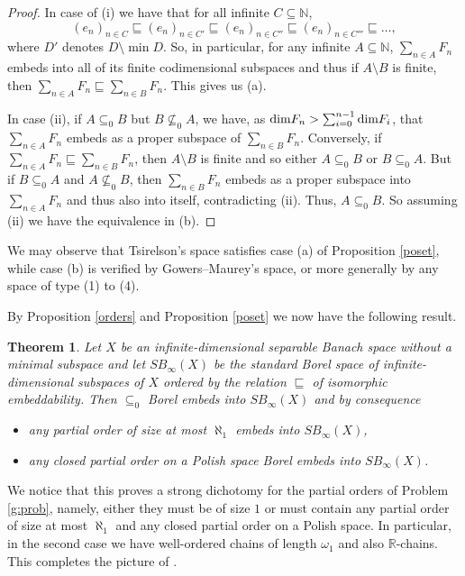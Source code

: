 \documentclass[10pt]{amsart}
\numberwithin{equation}{section}
\newtheorem{thm}{Theorem}[section]
\begin{document}
\begin{proof}
In case of (i) we have that for all infinite $C\subseteq {\mathbb N}$,
$$
(e_n)_{n\in C}\sqsubseteq(e_n)_{n\in C'}\sqsubseteq(e_n)_{n\in C''}\sqsubseteq(e_n)_{n\in C'''}\sqsubseteq\ldots,
$$
where $D'$ denotes $D\setminus \min D$. So, in particular, for any infinite
$A\subseteq {\mathbb N}$, $ \sum_{n\in A}F_n$ embeds into all of its finite
codimensional subspaces and thus if $A\setminus B$ is finite, then $\sum_{n\in
A}F_n \sqsubseteq \sum_{n\in B}F_n$. This gives us (a).

In case (ii), if $A\subseteq_0B$ but $B\not\subseteq_0 A$, we have, as ${\rm
dim}F_n>\sum_{i=0}^{n-1}{\rm dim}F_i$, that $\sum_{n\in A}F_n$ embeds as a
proper subspace of $\sum_{n\in B}F_n$. Conversely, if $\sum_{n\in
A}F_n\sqsubseteq\sum_{n\in B}F_n$, then $A\setminus B$ is finite and so either
$A\subseteq_0B$ or $B\subseteq_0A$. But if $B\subseteq_0A$ and
$A\not\subseteq_0B$, then $\sum_{n\in B}F_n$ embeds as a proper subspace into
$\sum_{n\in A}F_n$ and thus also into itself, contradicting (ii). Thus,
$A\subseteq_0B$. So assuming (ii) we have the equivalence in (b). \end{proof}

We may observe that  Tsirelson's space satisfies case (a) of Proposition
\ref{poset}, while case (b) is verified by Gowers--Maurey's space, or more
generally by any space of type (1) to (4).

By Proposition \ref{orders} and Proposition \ref{poset} we now have the
following result.

\begin{thm}
Let $X$ be an infinite-dimensional separable Banach space without a minimal
subspace and let $SB_\infty(X)$ be the standard Borel space of
infinite-dimensional subspaces of $X$ ordered by the relation $\sqsubseteq$ of
isomorphic embeddability. Then $\subseteq_0$ Borel embeds into $SB_\infty(X)$
and by consequence
\begin{itemize}
  \item[(a)] any partial order of size at most $\aleph_1$ embeds into $SB_\infty(X)$,
  \item[(b)] any closed partial order on a Polish space Borel embeds into $SB_\infty(X)$.
\end{itemize}
\end{thm}
We notice that this proves a strong dichotomy for the partial orders of Problem
\ref{g:prob}, namely, either they must be of size $1$ or must contain any
partial order of size at most $\aleph_1$ and any closed partial order on a
Polish space. In particular, in the second case we have well-ordered chains of
length $\omega_1$ and also ${\mathbb R}$-chains. This completes the picture of
\cite{survey}.
\end{document}
